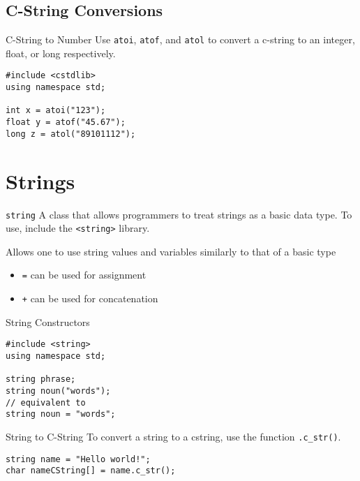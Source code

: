 \documentclass[\main/notes.tex]{subfiles}
\begin{document}
			\subsection{C-String Conversions}
				\begin{definition}{C-String to Number}
					Use \texttt{atoi}, \texttt{atof}, and \texttt{atol} to convert a c-string to an integer, float, or long respectively.
					\begin{verbatim}
#include <cstdlib>
using namespace std;

int x = atoi("123");
float y = atof("45.67");
long z = atol("89101112");
					\end{verbatim}
				\end{definition}

		\section{Strings}
			\begin{definition}{\texttt{string}}
				A class that allows programmers to treat strings as a basic data type. To use, include the \texttt{<string>} library.

				Allows one to use string values and variables similarly to that of a basic type 
				\begin{itemize}
					\item \texttt{=} can be used for assignment
					\item \texttt{+} can be used for concatenation
				\end{itemize}
			\end{definition}
			\begin{codebox}{String Constructors}
				\begin{verbatim}
#include <string>
using namespace std;

string phrase;
string noun("words");
// equivalent to
string noun = "words";
				\end{verbatim}
			\end{codebox}
			\begin{sidenote}{String to C-String}
				To convert a string to a cstring, use the function \texttt{.c_str()}.
				\begin{verbatim}
string name = "Hello world!";
char nameCString[] = name.c_str();
				\end{verbatim}
			\end{sidenote}
\end{document}
